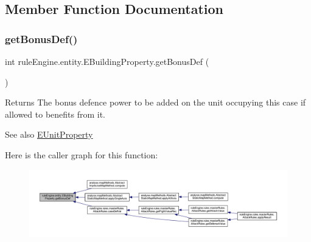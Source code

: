 \subsection{Member Function Documentation}
\mbox{\label{enumrule_engine_1_1entity_1_1_e_building_property_a65d0295002f2e355b4599132104d3314}} 
\subsubsection{\texorpdfstring{get\+Bonus\+Def()}{getBonusDef()}}
{\footnotesize\ttfamily int rule\+Engine.\+entity.\+E\+Building\+Property.\+get\+Bonus\+Def (\begin{DoxyParamCaption}{ }\end{DoxyParamCaption})\hspace{0.3cm}{\ttfamily [inline]}}

\begin{DoxyReturn}{Returns}
The bonus defence power to be added on the unit occupying this case if allowed to benefits from it. 
\end{DoxyReturn}
\begin{DoxySeeAlso}{See also}
\mbox{\hyperlink{enumrule_engine_1_1entity_1_1_e_unit_property}{E\+Unit\+Property}} 
\end{DoxySeeAlso}
Here is the caller graph for this function\+:
\nopagebreak
\begin{figure}[H]
\begin{center}
\leavevmode
\includegraphics[width=350pt]{enumrule_engine_1_1entity_1_1_e_building_property_a65d0295002f2e355b4599132104d3314_icgraph}
\end{center}
\end{figure}
\mbox{\label{enumrule_engine_1_1entity_1_1_e_building_property_af8fbe5d8bcbd5bd7c1c017bdfcd15d1d}} 
